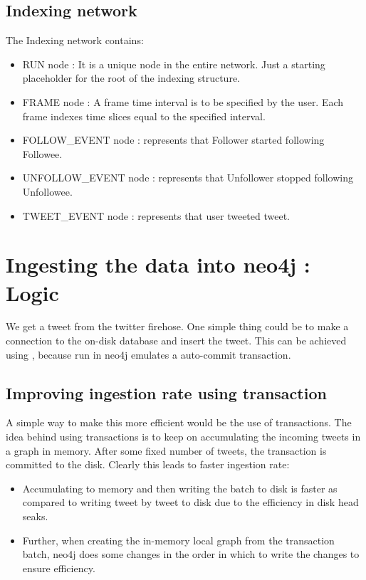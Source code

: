 \documentclass[letterpaper,10pt,english]{sphinxmanual}
\begin{document}
\subsection{Indexing network}
\label{\detokenize{neo4j_data_ingestion:indexing-network}}
The Indexing network contains:
\begin{itemize}
\item {} 
RUN node : It is a unique node in the entire network. Just a starting placeholder for the root of the indexing structure.

\item {} 
FRAME node : A frame time interval is to be specified by the user. Each frame indexes time slices equal to the specified interval.

\item {} 
FOLLOW\_EVENT node : represents that Follower started following Followee.

\item {} 
UNFOLLOW\_EVENT node : represents that Unfollower stopped following Unfollowee.

\item {} 
TWEET\_EVENT node : represents that user tweeted tweet.

\end{itemize}

\noindent{}


\section{Ingesting the data into neo4j : Logic}
\label{\detokenize{neo4j_data_ingestion:ingesting-the-data-into-neo4j-logic}}
We get a tweet from the twitter firehose. One simple thing could be to make a connection to the on-disk database and insert the tweet. This can be achieved using , because run in neo4j emulates a auto-commit transaction.


\subsection{Improving ingestion rate using transaction}
\label{\detokenize{neo4j_data_ingestion:improving-ingestion-rate-using-transaction}}
A simple way to make this more efficient would be the use of transactions. The idea behind using transactions is to keep on accumulating the incoming tweets in a graph in memory. After some fixed number of tweets, the transaction is committed to the disk. Clearly this leads to faster ingestion rate:
\begin{itemize}
\item {} 
Accumulating to memory and then writing the batch to disk is faster as compared to writing tweet by tweet to disk due to the efficiency in disk head seaks.

\item {} 
Further, when creating the in-memory local graph from the transaction batch, neo4j does some changes in the order in which to write the changes to ensure efficiency.

\end{itemize}
\end{document}
